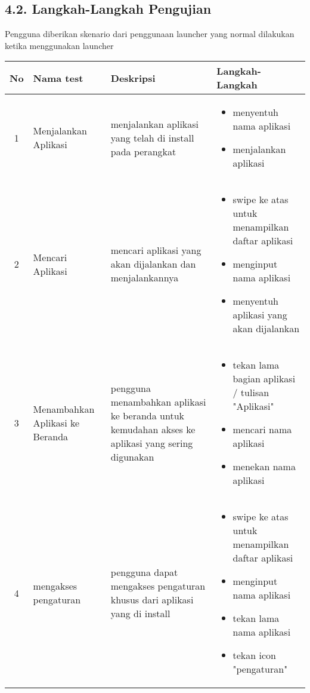 \subsection*{4.2. Langkah-Langkah Pengujian}
Pengguna diberikan skenario dari penggunaan launcher yang normal dilakukan ketika menggunakan launcher
\begin{table}[H]
  \begin{tabularx}{\textwidth}{|c|X|X|X|}
  \hline
  No & Nama test & Deskripsi & Langkah-Langkah \\
  \hline
1 & Menjalankan Aplikasi & menjalankan aplikasi yang telah di install pada perangkat &\begin{itemize}\item menyentuh nama aplikasi \item menjalankan aplikasi \end{itemize} \\
  \hline
2 & Mencari Aplikasi & mencari aplikasi yang akan dijalankan dan menjalankannya & \begin{itemize}\item swipe ke atas untuk menampilkan daftar aplikasi \item menginput nama aplikasi \item menyentuh aplikasi yang akan dijalankan\end{itemize} \\
  \hline
  3 & Menambahkan Aplikasi ke Beranda & pengguna menambahkan aplikasi ke beranda untuk kemudahan akses ke aplikasi yang sering digunakan & \begin{itemize}
    \item tekan lama bagian aplikasi / tulisan "Aplikasi"
    \item mencari nama aplikasi 
    \item menekan nama aplikasi
  \end{itemize} \\
  \hline
  4 & mengakses pengaturan & pengguna dapat mengakses pengaturan khusus dari aplikasi yang di install & \begin{itemize}
    \item swipe ke atas untuk menampilkan daftar aplikasi
    \item menginput nama aplikasi
    \item tekan lama nama aplikasi
    \item tekan icon "pengaturan"
  \end{itemize} \\
  \hline
\end{tabularx}
\end{table}

